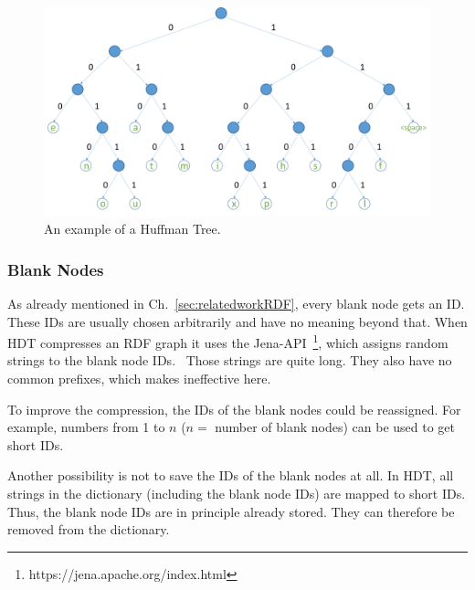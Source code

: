 \begin{figure}
	\centering
	\includegraphics[width=0.8\linewidth]{figures/4_rdf_specific_features/huffman}
	\caption{An example of a Huffman Tree.}
	\label{fig:huffmantree}
\end{figure}


\subsubsection{Blank Nodes}\label{sec:approachBlankNodes}

As already mentioned in Ch.~\ref{sec:relatedworkRDF}, every blank node gets an ID. These IDs are usually chosen arbitrarily and have no meaning beyond that. When HDT compresses an RDF graph it uses the Jena-API~\footnote{\label{foot:5}https://jena.apache.org/index.html}, which assigns random strings to the blank node IDs.~\cite{hdt} Those strings are quite long. They also have no common prefixes, which makes \DHDT{} ineffective here. 

To improve the compression, the IDs of the blank nodes could be reassigned. For example, numbers from 1 to $n$ ($n=$ number of blank nodes) can be used to get short IDs. 

Another possibility is not to save the IDs of the blank nodes at all. In HDT, all strings in the dictionary (including the blank node IDs) are mapped to short IDs. Thus, the blank node IDs are in principle already stored. They can therefore be removed from the dictionary. 















